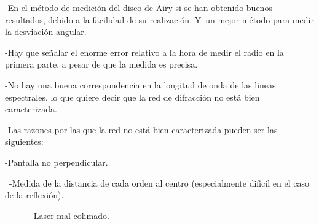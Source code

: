 \documentclass[12pt,thmsa]{article}
\begin{document}
-En el m\'{e}todo de medici\'{o}n del disco de Airy si se han obtenido
buenos resultados, debido a la facilidad de su realizaci\'{o}n. Y\ un mejor
m\'{e}todo para medir la desviaci\'{o}n angular.

-Hay que se\~{n}alar el enorme error relativo a la hora de medir el radio en
la primera parte, a pesar de que la medida es precisa.

-No hay una buena correspondencia en la longitud de onda de las lineas
espectrales, lo que quiere decir que la red de difracci\'{o}n no est\'{a}
bien caracterizada.

-Las razones por las que la red no est\'{a} bien caracterizada pueden ser
las siguientes:

\qquad -Pantalla no perpendicular.

\qquad\ -Medida de la distancia de cada orden al centro (especialmente
dificil en el caso de la reflexi\'{o}n).

\ \ \ \ \ \ -Laser mal colimado.

\vspace{1pt}
\end{document}

